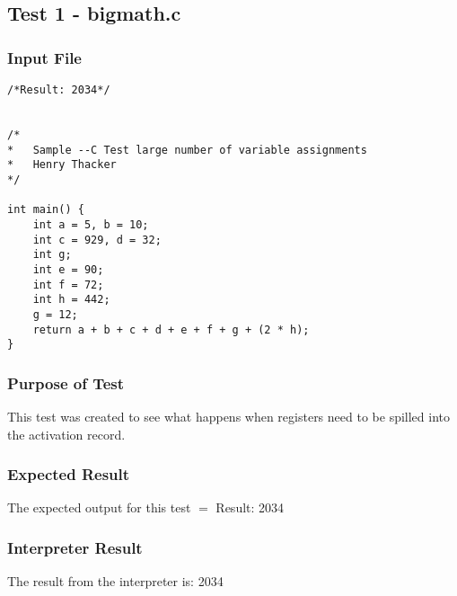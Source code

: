 \subsection{Test 1 - bigmath.c}
\subsubsection{Input File}
\begin{lstlisting}[showstringspaces=false,breaklines=true,backgroundcolor=\color{light-gray}, captionpos=b]
/*Result: 2034*/


/*
*	Sample --C Test large number of variable assignments
*	Henry Thacker
*/

int main() {
	int a = 5, b = 10;
	int c = 929, d = 32;
	int g;
	int e = 90;
	int f = 72;
	int h = 442;
	g = 12;
	return a + b + c + d + e + f + g + (2 * h); 
}
\end{lstlisting}\subsubsection{Purpose of Test}
This test was created to see what happens when registers need to be spilled into the activation record.

\subsubsection{Expected Result}
The expected output for this test $=$ Result: 2034
\subsubsection{Interpreter Result}
The result from the interpreter is: 2034
